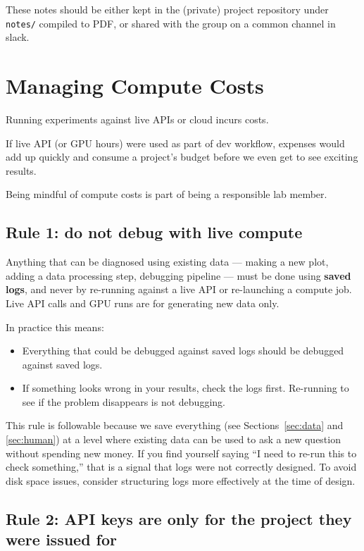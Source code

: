 \documentclass[11pt, letterpaper]{article}
\begin{document}
These notes should be either kept in the (private) project repository under \texttt{notes/} compiled to PDF, or shared with the group on a common channel in slack.
 


\section{Managing Compute Costs}

Running experiments against live APIs or cloud incurs costs. 

If live API (or GPU hours) were used as part of dev workflow, expenses would add up quickly and consume a project's budget before we even get to see exciting results. 

Being mindful of compute costs is part of being a responsible lab member.

\subsection*{Rule 1: do not debug with live compute}

Anything that can be diagnosed using existing data --- making a new plot, adding a data processing step, debugging pipeline --- must be done using \textbf{saved logs}, and never by re-running against a live API or re-launching a compute job. Live API calls and GPU runs are for generating new data only.

In practice this means:
\begin{itemize}
    \item Everything that could be debugged against saved logs should be debugged against saved logs.
    \item If something looks wrong in your results, check the logs first. Re-running to see if the problem disappears is not debugging.
\end{itemize}

This rule is followable because we save everything (see Sections~\ref{sec:data} and \ref{sec:human}) at a level where existing data can be used to ask a new question without spending new money. If you find yourself saying ``I need to re-run this to check something,'' that is a signal that logs were not correctly designed. To avoid disk space issues, consider structuring logs more effectively at the time of design.

\subsection*{Rule 2: API keys are only for the project they were issued for}
\end{document}
